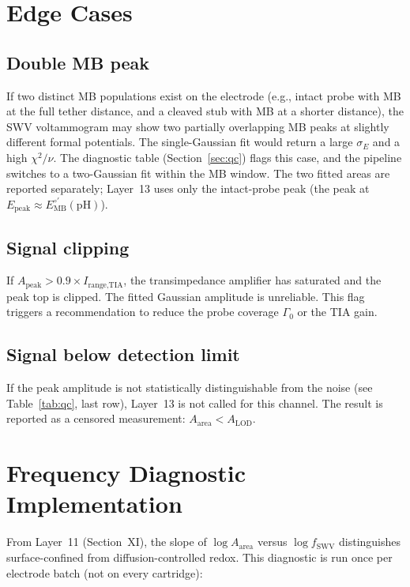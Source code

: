 \documentclass[10pt,a4paper]{article}
\numberwithin{equation}{section}
\newcommand{\Eo}{E^{\circ\prime}}
\newcommand{\Apk}{A_{\text{peak}}}
\newcommand{\Aarea}{A_{\text{area}}}
\newcommand{\Epk}{E_{\text{peak}}}
\begin{document}
\section{Edge Cases}
\label{sec:edge}

\subsection{Double MB peak}

If two distinct MB populations exist on the electrode (e.g., intact probe
with MB at the full tether distance, and a cleaved stub with MB at a shorter
distance), the SWV voltammogram may show two partially overlapping MB peaks
at slightly different formal potentials. The single-Gaussian fit would
return a large $\sigma_E$ and a high $\chi^2/\nu$. The diagnostic table
(Section~\ref{sec:qc}) flags this case, and the pipeline switches to a
two-Gaussian fit within the MB window. The two fitted areas are reported
separately; Layer~13 uses only the intact-probe peak (the peak at
$\Epk \approx \Eo_\text{MB}(\text{pH})$).

\subsection{Signal clipping}

If $\Apk > 0.9 \times I_\text{range,TIA}$, the transimpedance amplifier has
saturated and the peak top is clipped. The fitted Gaussian amplitude is
unreliable. This flag triggers a recommendation to reduce the probe coverage
$\Gamma_0$ or the TIA gain.

\subsection{Signal below detection limit}

If the peak amplitude is not statistically distinguishable from the noise
(see Table~\ref{tab:qc}, last row), Layer~13 is not called for this channel.
The result is reported as a censored measurement: $A_\text{area} < A_\text{LOD}$.

\section{Frequency Diagnostic Implementation}
\label{sec:freqdiag}

From Layer~11 (Section~XI), the slope of $\log\Aarea$ versus $\log f_\text{SWV}$
distinguishes surface-confined from diffusion-controlled redox. This
diagnostic is run once per electrode batch (not on every cartridge):
\end{document}
